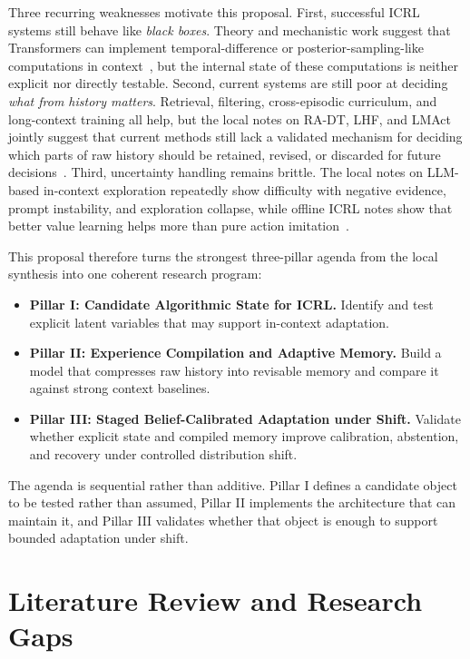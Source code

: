 \documentclass[10pt,twocolumn,letterpaper]{article}
\begin{document}
Three recurring weaknesses motivate this proposal. First, successful ICRL systems still behave like \emph{black boxes}. Theory and mechanistic work suggest that Transformers can implement temporal-difference or posterior-sampling-like computations in context~\cite{lin2023decisionmakers,wang2024td,demircan2024sae}, but the internal state of these computations is neither explicit nor directly testable. Second, current systems are still poor at deciding \emph{what from history matters}. Retrieval, filtering, cross-episodic curriculum, and long-context training all help, but the local notes on RA-DT, LHF, and LMAct jointly suggest that current methods still lack a validated mechanism for deciding which parts of raw history should be retained, revised, or discarded for future decisions~\cite{schmied2024radt,chen2025lhf,ruoss2024lmact}. Third, uncertainty handling remains brittle. The local notes on LLM-based in-context exploration repeatedly show difficulty with negative evidence, prompt instability, and exploration collapse, while offline ICRL notes show that better value learning helps more than pure action imitation~\cite{krishnamurthy2024explore,nie2024evolve,monea2024llms,tarasov2025qlearning}.

This proposal therefore turns the strongest three-pillar agenda from the local synthesis into one coherent research program:
\begin{itemize}[leftmargin=1.2em]
\item \textbf{Pillar I: Candidate Algorithmic State for ICRL.} Identify and test explicit latent variables that may support in-context adaptation.
\item \textbf{Pillar II: Experience Compilation and Adaptive Memory.} Build a model that compresses raw history into revisable memory and compare it against strong context baselines.
\item \textbf{Pillar III: Staged Belief-Calibrated Adaptation under Shift.} Validate whether explicit state and compiled memory improve calibration, abstention, and recovery under controlled distribution shift.
\end{itemize}

The agenda is sequential rather than additive. Pillar I defines a candidate object to be tested rather than assumed, Pillar II implements the architecture that can maintain it, and Pillar III validates whether that object is enough to support bounded adaptation under shift.

\section{Literature Review and Research Gaps}
\end{document}
